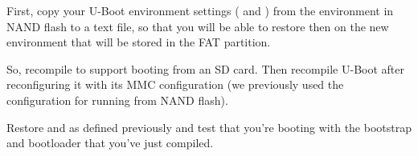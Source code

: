 First, copy your U-Boot environment settings
( and ) from the environment in NAND
flash to a text file, so that you will be able to restore then
on the new environment that will be stored in the FAT partition.

So, recompile 
to support booting from an SD card.
Then recompile U-Boot after reconfiguring it with its MMC configuration
(we previously used the configuration for running from NAND flash).

Restore  and  as defined previously
and test that you're booting with the bootstrap and bootloader
that you've just compiled.
